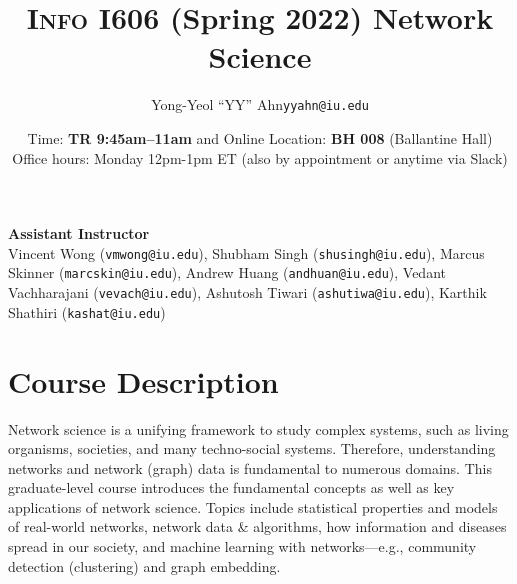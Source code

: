 \documentclass[11pt,article,oneside]{memoir} %
\makeatletter
\def\myauthor{Author}
\def\mytitle{Title}
\def\myemail{yyahn@iu.edu}
\def\myauthor{Yong-Yeol ``YY'' Ahn}
\def\mytitle{{\normalsize \textsc{Info} I606 (Spring 2022) \newline} \HUGE Network Science}
\makeatother
\begin{document}


\def\ind{\hangindent=1 true cm\hangafter=1 \noindent}
\def\labelitemi{$\cdot$}


\title{\LARGE \mytitle}
\author{\Large\myauthor \newline \footnotesize\texttt{\noindent\myemail}}
\date{Time: \textbf{TR 9:45am--11am} and Online%
\newline Location: \textbf{BH 008} (Ballantine Hall) 
\newline Office hours: Monday 12pm-1pm ET (also by appointment or anytime via Slack)}

\maketitle
\vspace{-20pt}
{\bfseries Assistant Instructor} \\ 
Vincent Wong (\texttt{vmwong@iu.edu}), Shubham Singh (\texttt{shusingh@iu.edu}), Marcus Skinner (\texttt{marcskin@iu.edu}), Andrew Huang (\texttt{andhuan@iu.edu}), Vedant Vachharajani (\texttt{vevach@iu.edu}), Ashutosh Tiwari (\texttt{ashutiwa@iu.edu}), Karthik Shathiri (\texttt{kashat@iu.edu})

\section{Course Description} %

Network science is a unifying framework to study complex systems, such as living organisms, societies, and many techno-social systems. 
Therefore, understanding networks and network (graph) data is fundamental to numerous domains. 
This graduate-level course introduces the fundamental concepts as well as key applications of network science.
Topics include statistical properties and models of real-world networks, network data \& algorithms, how information and diseases spread in our society, and machine learning with networks---e.g., community detection (clustering) and graph embedding.
\end{document}
